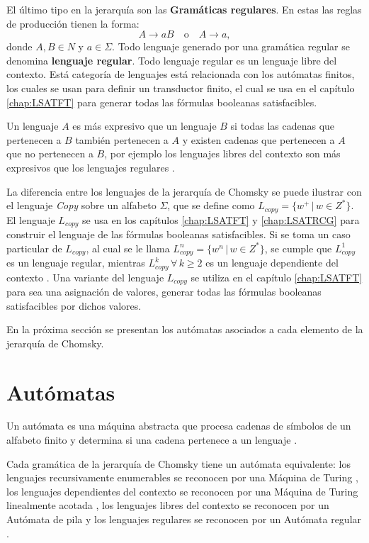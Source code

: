 \documentclass[12pt]{article}
\begin{document}
El último tipo en la jerarquía son las \textbf{Gramáticas regulares}. En estas las reglas de producción tienen la forma:
\[
  A \to aB \quad \text{o} \quad A \to a,
\]
donde \(A, B \in N\) y \(a \in \Sigma\).
Todo lenguaje generado por una gramática regular se denomina \textbf{lenguaje regular}.
Todo lenguaje regular es un lenguaje libre del contexto. Está categoría de lenguajes está relacionada con los autómatas
finitos, los cuales se usan para definir un transductor finito, el cual se usa en el capítulo \ref{chap:LSATFT} para 
generar todas las fórmulas booleanas satisfacibles.

Un lenguaje $A$ es más expresivo que un lenguaje $B$ si todas las cadenas que pertenecen a $B$ también pertenecen a $A$ y existen cadenas 
que pertenecen a $A$ que no pertenecen a $B$, por ejemplo los lenguajes libres del contexto son más expresivos que los lenguajes regulares \cite{authomataTheory}. 

La diferencia entre los lenguajes de la jerarquía de Chomsky se puede ilustrar con el lenguaje \textit{Copy} sobre un alfabeto $\Sigma$, que se define como 
$L_{copy}=\{w^+\,|\,w\in Z^*\}$. El lenguaje $L_{copy}$ se usa en los  capítulos \ref{chap:LSATFT} y 
\ref{chap:LSATRCG} para construir el lenguaje de las fórmulas booleanas satisfacibles. 
Si se toma un caso particular de $L_{copy}$, al cual se le llama $L_{copy}^n=\{w^n\,|\,w\in Z^*\}$, se cumple que 
$L_{copy}^1$ es un lenguaje regular, mientras $L_{copy}^k\,\forall\,k\geq 2$ es un lenguaje dependiente del contexto \cite{authomataTheory}. 
Una variante del lenguaje $L_{copy}$ se utiliza en el capítulo \ref{chap:LSATFT} para
sea una asignación de valores, generar todas las fórmulas booleanas satisfacibles por dichos valores.

En la próxima sección se presentan los autómatas asociados a cada elemento de la jerarquía de Chomsky. 

\section{Autómatas}

Un autómata es una máquina abstracta que procesa cadenas de símbolos de un alfabeto finito y determina si una 
cadena pertenece a un lenguaje \cite{authomataTheory}.

Cada gramática de la jerarquía de Chomsky tiene un autómata equivalente: los lenguajes recursivamente enumerables 
se reconocen por una Máquina de Turing \cite{authomataTheory}, los lenguajes dependientes del contexto
se reconocen por una Máquina de Turing linealmente acotada \cite{authomataTheory}, los lenguajes libres del contexto 
se reconocen por un Autómata de pila \cite{authomataTheory} y  los lenguajes regulares se reconocen por un Autómata 
regular \cite{authomataTheory}.
\end{document}
